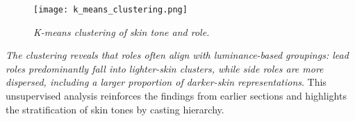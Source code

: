 \begin{figure}[!htpb]
    \centering
    \texttt{[image: k\_means\_clustering.png]}
    \caption{\textit{K-means clustering of skin tone and role.}}
    \label{fig: K-means clustering of skin tone and role}
\end{figure}

\textit{The clustering reveals that roles often align with luminance-based groupings: lead roles predominantly fall into lighter-skin clusters, while side roles are more dispersed, including a larger proportion of darker-skin representations}. This unsupervised analysis reinforces the findings from earlier sections and highlights the stratification of skin tones by casting hierarchy.